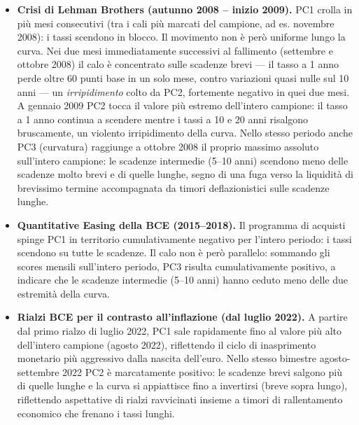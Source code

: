 \documentclass[11pt,a4paper]{article}
\theoremstyle{plain}
\theoremstyle{definition}
\theoremstyle{remark}
\begin{document}
\begin{itemize}
  \item \textbf{Crisi di Lehman Brothers (autunno 2008 -- inizio 2009).} PC1 crolla in
        più mesi consecutivi (tra i cali più marcati del campione, ad es. novembre
        2008): i tassi scendono in blocco. Il movimento non è però uniforme lungo la
        curva. Nei due mesi immediatamente successivi al fallimento (settembre e
        ottobre 2008) il calo è concentrato sulle scadenze brevi --- il tasso a 1 anno
        perde oltre 60 punti base in un solo mese, contro variazioni quasi nulle sul
        10 anni --- un \emph{irripidimento} colto da PC2, fortemente negativo in
        quei due mesi. A gennaio 2009 PC2 tocca il valore più estremo dell'intero
        campione: il tasso a 1 anno continua a scendere mentre i tassi a 10 e 20 anni
        risalgono bruscamente, un violento irripidimento della curva.
         Nello stesso periodo anche PC3 (curvatura) raggiunge a
        ottobre 2008 il proprio massimo assoluto sull'intero campione: le scadenze
        intermedie (5--10 anni) scendono meno delle scadenze molto brevi e di quelle
        lunghe, segno di una fuga verso la liquidità di brevissimo termine accompagnata
        da timori deflazionistici sulle scadenze lunghe.

  \item \textbf{Quantitative Easing della BCE (2015--2018).} Il programma di acquisti
        spinge PC1 in territorio cumulativamente negativo per l'intero periodo: i
        tassi scendono su tutte le scadenze. Il calo non è però parallelo: sommando
        gli scores mensili sull'intero periodo, PC3 risulta cumulativamente positivo,
        a indicare che le scadenze intermedie (5--10 anni) hanno ceduto meno delle due
        estremità della curva.

  \item \textbf{Rialzi BCE per il contrasto all'inflazione (dal luglio 2022).} A
        partire dal primo rialzo di luglio 2022, PC1 sale rapidamente fino al valore
        più alto dell'intero campione (agosto 2022), riflettendo il ciclo di
        inasprimento monetario più aggressivo dalla nascita dell'euro. Nello stesso
        bimestre agosto-settembre 2022 PC2 è marcatamente positivo: le scadenze brevi
        salgono più di quelle lunghe e la curva si appiattisce fino a invertirsi
        (breve sopra lungo), riflettendo aspettative di rialzi ravvicinati insieme a
        timori di rallentamento economico che frenano i tassi lunghi. 
\end{itemize}
\end{document}
